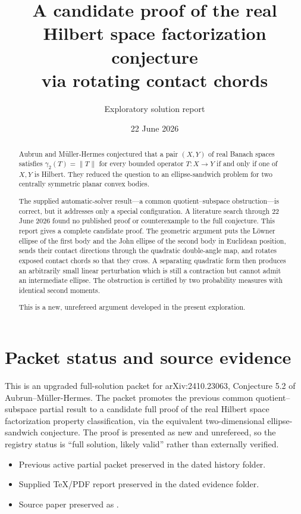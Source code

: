 \documentclass[11pt]{amsart}
\title[A candidate proof of the real HFP conjecture]{A candidate proof of the real Hilbert space factorization conjecture\\via rotating contact chords}
\author{Exploratory solution report}
\date{22 June 2026}
\theoremstyle{definition}
\theoremstyle{remark}
\begin{document}
\begin{abstract}
Aubrun and M\"uller-Hermes conjectured that a pair $(X,Y)$ of real Banach
spaces satisfies $\gamma_2(T)=\|T\|$ for every bounded operator $T:X\to Y$
if and only if one of $X,Y$ is Hilbert.  They reduced the question to an
ellipse-sandwich problem for two centrally symmetric planar convex bodies.

The supplied automatic-solver result---a common quotient--subspace
obstruction---is correct, but it addresses only a special configuration.  A
literature search through 22 June 2026 found no published proof or
counterexample to the full conjecture.  This report gives a complete candidate proof.
The geometric argument puts the L\"owner ellipse of the first body and the
John ellipse of the second body in Euclidean position, sends their contact
directions through the quadratic double-angle map, and rotates exposed
contact chords so that they cross.  A separating quadratic form then produces
an arbitrarily small linear perturbation which is still a contraction but
cannot admit an intermediate ellipse.  The obstruction is certified by two
probability measures with identical second moments.

This is a new, unrefereed argument developed in the present exploration.
\end{abstract}

\maketitle

\section*{Packet status and source evidence}

This is an upgraded full-solution packet for arXiv:2410.23063, Conjecture 5.2
of Aubrun--M\"uller-Hermes.  The packet promotes the previous common
quotient--subspace partial result to a candidate full proof of the real
Hilbert space factorization property classification, via the equivalent
two-dimensional ellipse-sandwich conjecture.  The proof is presented as
new and unrefereed, so the registry status is ``full solution, likely valid''
rather than externally verified.

\begin{itemize}
\item Previous active partial packet preserved in the dated history folder.
\item Supplied TeX/PDF report preserved in the dated evidence folder.
\item Source paper preserved as .
\end{itemize}
\end{document}
